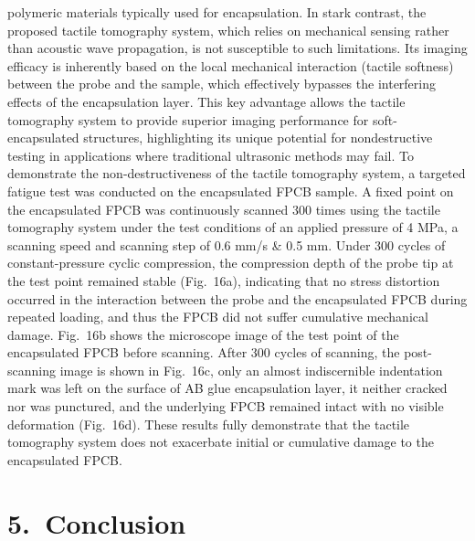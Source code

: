 \documentclass[11pt]{article}
\begin{document}
\setcounter{equation}{1}

polymeric materials typically used for encapsulation. In stark
contrast, the proposed tactile tomography system, which relies on
mechanical sensing rather than acoustic wave propagation, is not
susceptible to such limitations. Its imaging efficacy is inherently
based on the local mechanical interaction (tactile softness)
between the probe and the sample, which effectively bypasses the
interfering effects of the encapsulation layer. This key advantage
allows the tactile tomography system to provide superior imaging
performance for soft-encapsulated structures, highlighting its
unique potential for nondestructive testing in applications where
traditional ultrasonic methods may fail. To demonstrate the
non-destructiveness of the tactile tomography system, a targeted
fatigue test was conducted on the encapsulated FPCB sample. A fixed
point on the encapsulated FPCB was continuously scanned 300 times
using the tactile tomography system under the test conditions of
an applied pressure of 4 MPa, a scanning speed and scanning step
of 0.6 mm/s \& 0.5 mm. Under 300 cycles of constant-pressure
cyclic compression, the compression depth of the probe tip at the
test point remained stable (Fig.~16a), indicating that no stress
distortion occurred in the interaction between the probe and the
encapsulated FPCB during repeated loading, and thus the FPCB did
not suffer cumulative mechanical damage. Fig.~16b shows the
microscope image of the test point of the encapsulated FPCB before
scanning. After 300 cycles of scanning, the post-scanning image is
shown in Fig.~16c, only an almost indiscernible indentation mark
was left on the surface of AB glue encapsulation layer, it neither
cracked nor was punctured, and the underlying FPCB remained intact
with no visible deformation (Fig.~16d). These results fully
demonstrate that the tactile tomography system does not exacerbate
initial or cumulative damage to the encapsulated FPCB.

\section*{5.\ Conclusion}
\end{document}
